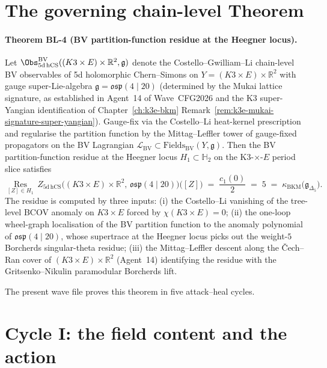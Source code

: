 \section*{The governing chain-level Theorem}

\paragraph{Theorem BL-4 (BV partition-function residue at the Heegner
locus).}
Let $\Obs^{\mathrm{BV}}_{5\mathrm{d\,hCS}}((K3 \times E) \times
\mathbb{R}^2, \mathfrak{g})$ denote the Costello--Gwilliam--Li
chain-level BV observables of 5d holomorphic Chern--Simons on
$Y = (K3 \times E) \times \mathbb{R}^2$ with gauge super-Lie-algebra
$\mathfrak{g} = \mathfrak{osp}(4 \mid 20)$ (determined by the Mukai
lattice signature, as established in Agent~14 of Wave~CFG2026 and the
K3 super-Yangian identification of Chapter~\ref{ch:k3e-bkm}
Remark~\ref{rem:k3e-mukai-signature-super-yangian}). Gauge-fix via the
Costello--Li heat-kernel prescription and regularise the
partition function by the Mittag--Leffler tower of gauge-fixed
propagators on the BV Lagrangian
$\mathcal{L}_{\mathrm{BV}} \subset \mathrm{Fields}_{\mathrm{BV}}(Y,
\mathfrak{g})$. Then the BV partition-function residue at the Heegner
locus $H_1 \subset \mathbb{H}_2$ on the K3-$\times$-$E$ period slice
satisfies
\begin{equation}
\label{eq:BL-4-theorem-BV-residue}
 \underset{[Z] \in H_1}{\operatorname*{Res}}\,
 Z_{5\mathrm{d\,hCS}}\bigl( (K3 \times E) \times \mathbb{R}^2,\,
 \mathfrak{osp}(4 \mid 20) \bigr)\bigl([Z]\bigr)
 \;=\; \frac{c_1(0)}{2} \;=\; 5
 \;=\; \kappa_{\mathrm{BKM}}\bigl(\mathfrak{g}_{\Delta_5}\bigr).
\end{equation}
The residue is computed by three inputs: (i) the Costello--Li vanishing
of the tree-level BCOV anomaly on $K3 \times E$ forced by
$\chi(K3 \times E) = 0$; (ii) the one-loop wheel-graph localisation of
the BV partition function to the anomaly polynomial of
$\mathfrak{osp}(4 \mid 20)$, whose supertrace at the Heegner locus
picks out the weight-$5$ Borcherds singular-theta residue; (iii) the
Mittag--Leffler descent along the Čech--Ran cover of $(K3 \times E)
\times \mathbb{R}^2$ (Agent~14) identifying the residue with the
Gritsenko--Nikulin paramodular Borcherds lift.

The present wave file proves this theorem in five attack--heal cycles.

\section*{Cycle I: the field content and the action}
\label{sec:BL-4-cycle-1}

